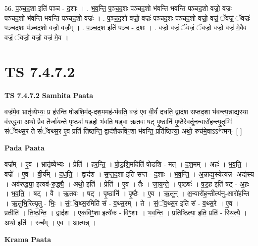 \documentclass[17pt]{extarticle}
\begin{document}
56. प॒ञ्च॒द॒शा इति॑ पञ्च - द॒शाः । . भ॒व॒न्ति॒ प॒ञ्च॒द॒शः प॑ञ्चद॒शो भ॑वन्ति भवन्ति पञ्चद॒शो वज्रो॒ वज्रः॑ पञ्चद॒शो भ॑वन्ति भवन्ति पञ्चद॒शो वज्रः॑ । . प॒ञ्च॒द॒शो वज्रो॒ वज्रः॑ पञ्चद॒शः प॑ञ्चद॒शो वज्रो॒ वज्रं॒ ॅवज्रं॒ ॅवज्रः॑ पञ्चद॒शः प॑ञ्चद॒शो वज्रो॒ वज्र᳚म् । . प॒ञ्च॒द॒श इति॑ पञ्च - द॒शः । . वज्रो॒ वज्रं॒ ॅवज्रं॒ ॅवज्रो॒ वज्रो॒ वज्र॑ मे॒वैव वज्रं॒ ॅवज्रो॒ वज्रो॒ वज्र॑ मे॒व । \newline
\pagebreak
{}

\section{ TS 7.4.7.2 }

\textbf{TS 7.4.7.2 } \newline
\textbf{Samhita Paata} \newline

वज्र॑मे॒व भ्रातृ॑व्येभ्यः॒ प्र ह॑रन्ति षोडशि॒म॑द्-दश॒ममह॑-र्भवति॒ वज्र॑ ए॒व वी॒र्यं॑ दधति॒ द्वाद॑श सप्तद॒शा भ॑वन्त्य॒न्नाद्य॒स्या व॑रुद्ध्या॒ अथो॒ प्रैव तैर्जा॑यन्ते॒ पृष्ठ्यः॑ षड॒हो भ॑वति॒ षड्वा ऋ॒तवः॒ षट् पृ॒ष्ठानि॑ पृ॒ष्ठैरे॒वर्तून॒न्वारो॑हन्त्यृ॒तृभिः॑ संॅवथ्स॒रं ते सं॑ॅवथ्स॒र ए॒व प्रति॑ तिष्ठन्ति॒ द्वाद॑शैकविꣳ॒॒शा भ॑वन्ति॒ प्रति॑ष्ठित्या॒ अथो॒ रुच॑मे॒वाऽऽ*त्मन्- [  ] \newline

\textbf{Pada Paata} \newline

वज्र᳚म् । ए॒व । भ्रातृ॑व्येभ्यः । प्रेति॑ । ह॒र॒न्ति॒ । षो॒ड॒शि॒मदिति॑ षोडशि - मत् । द॒श॒मम् । अहः॑ । भ॒व॒ति॒ । वज्रे᳚ । ए॒व । वी॒र्य᳚म् । द॒ध॒ति॒ । द्वाद॑श । स॒प्त॒द॒शा इति॑ सप्त - द॒शाः । भ॒व॒न्ति॒ । अ॒न्नाद्य॒स्येत्य॑न्न- अद्य॑स्य । अव॑रुद्ध्या॒ इत्यव॑-रु॒द्ध्यै॒ । अथो॒ इति॑ । प्रेति॑ । ए॒व । तैः । जा॒य॒न्ते॒ । पृष्ठ्यः॑ । ष॒ड॒ह इति॑ षट् - अ॒हः । भ॒व॒ति॒ । षट् । वै । ऋ॒तवः॑ । षट् । पृ॒ष्ठानि॑ । पृ॒ष्ठैः । ए॒व । ऋ॒तून् । अ॒न्वारो॑ह॒न्तीत्य॑नु-आरो॑हन्ति । ऋ॒तुभि॒रित्यृ॒तु - भिः॒ । सं॒ॅव॒थ्स॒रमिति॑ सं - व॒थ्स॒रम् । ते । सं॒ॅव॒थ्स॒र इति॑ सं - व॒थ्स॒रे । ए॒व । प्रतीति॑ । ति॒ष्ठ॒न्ति॒ । द्वाद॑श । ए॒क॒विꣳ॒॒शा इत्ये॑क - विꣳ॒॒शाः । भ॒व॒न्ति॒ । प्रति॑ष्ठित्या॒ इति॒ प्रति॑ - स्थि॒त्यै॒ । अथो॒ इति॑ । रुच᳚म् । ए॒व । आ॒त्मन्न् ।  \newline


\textbf{Krama Paata} \newline
\end{document}
